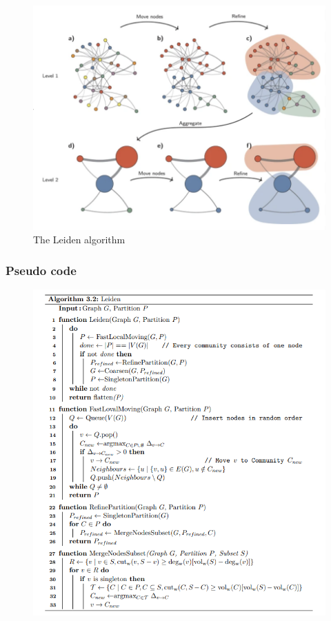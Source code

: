 \begin{figure}[H]
    \centering
    \includegraphics[width=12cm]{image/6.png}
    \caption{The Leiden algorithm}
\end{figure}
\subsubsection{Pseudo code}
\begin{figure}[H]
    \centering
    \includegraphics[width=1\textwidth]{image/pseudo code.png}
  
\end{figure}

